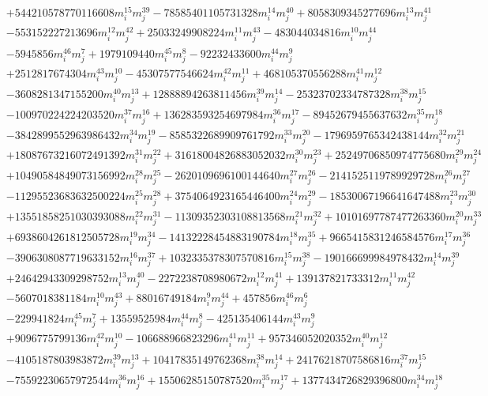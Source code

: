 {\begin{align*}
&+544210578770116608m_i^{15}m_j^{39}-78585401105731328m_i^{14}m_j^{40}+8058309345277696m_i^{13}m_j^{41}\\
&-553152227213696m_i^{12}m_j^{42}+25033249908224m_i^{11}m_j^{43}-483044034816m_i^{10}m_j^{44}\\
&-5945856m_i^{46}m_j^{7}+1979109440m_i^{45}m_j^{8}-92232433600m_i^{44}m_j^{9}\\
&+2512817674304m_i^{43}m_j^{10}-45307577546624m_i^{42}m_j^{11}+468105370556288m_i^{41}m_j^{12}\\
&-3608281347155200m_i^{40}m_j^{13}+12888894263811456m_i^{39}m_j^{14}-25323702334787328m_i^{38}m_j^{15}\\
&-100970224224203520m_i^{37}m_j^{16}+136283593254697984m_i^{36}m_j^{17}-89452679455637632m_i^{35}m_j^{18}\\
&-3842899552963986432m_i^{34}m_j^{19}-8585322689909761792m_i^{33}m_j^{20}-1796959765342438144m_i^{32}m_j^{21}\\
&+18087673216072491392m_i^{31}m_j^{22}+31618004826883052032m_i^{30}m_j^{23}+25249706850974775680m_i^{29}m_j^{24}\\
&+10490584849073156992m_i^{28}m_j^{25}-2620109696100144640m_i^{27}m_j^{26}-2141525119789929728m_i^{26}m_j^{27}\\
&-11295523683632500224m_i^{25}m_j^{28}+3754064923165446400m_i^{24}m_j^{29}-18530067196641647488m_i^{23}m_j^{30}\\
&+13551858251030393088m_i^{22}m_j^{31}-11309352303108813568m_i^{21}m_j^{32}+10101697787477263360m_i^{20}m_j^{33}\\
&+6938604261812505728m_i^{19}m_j^{34}-14132228454883190784m_i^{18}m_j^{35}+9665415831246584576m_i^{17}m_j^{36}\\
&-3906308087719633152m_i^{16}m_j^{37}+1032335378307570816m_i^{15}m_j^{38}-190166699984978432m_i^{14}m_j^{39}\\
&+24642943309298752m_i^{13}m_j^{40}-2272238708980672m_i^{12}m_j^{41}+139137821733312m_i^{11}m_j^{42}\\
&-5607018381184m_i^{10}m_j^{43}+88016749184m_i^{9}m_j^{44}+457856m_i^{46}m_j^{6}\\
&-229941824m_i^{45}m_j^{7}+13559525984m_i^{44}m_j^{8}-425135406144m_i^{43}m_j^{9}\\
&+9096775799136m_i^{42}m_j^{10}-106688966823296m_i^{41}m_j^{11}+957346052020352m_i^{40}m_j^{12}\\
&-4105187803983872m_i^{39}m_j^{13}+10417835149762368m_i^{38}m_j^{14}+24176218707586816m_i^{37}m_j^{15}\\
&-75592230657972544m_i^{36}m_j^{16}+15506285150787520m_i^{35}m_j^{17}+1377434726829396800m_i^{34}m_j^{18}\\

\end{align*}}
